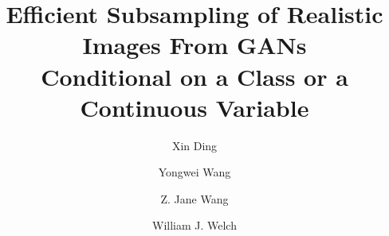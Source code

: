 \documentclass[final,12pt, 3p,times]{elsarticle}
\begin{document}
\date{}
\begin{frontmatter}








\title{Efficient Subsampling of Realistic Images From GANs \\ Conditional on a Class or a Continuous Variable}

\author[contact1]{Xin Ding}
\author[contact2]{Yongwei Wang}
\author[contact2]{Z. Jane Wang}
\author[contact2]{William J. Welch}



\address[contact1]{Department of Statistics, University of British Columbia, Vancouver, BC, V6T 1Z4, Canada\\}
\address[contact2]{Department
	of Electrical and Computer Engineering, University of British Columbia, Vancouver,
	BC, V6T 1Z4, Canada\\}



\end{frontmatter}
\end{document}
